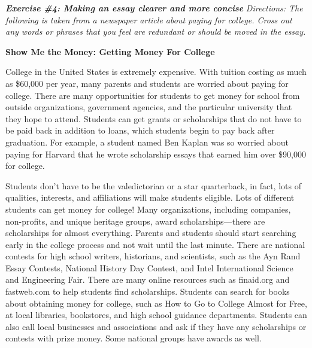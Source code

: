 \documentclass[12pt]{book}
\renewcommand{\indent}{\hspace{1cm}}
\begin{document}
\bigskip
\textbf{\textit{Exercise \#4: Making an essay clearer and more concise}}
\bigskip
\textit{Directions: The following is taken from a newspaper article about paying for college. Cross out any words or phrases that you feel are redundant or should be moved in the essay.}

\begin{spacing}{2}
\begin{center}
\textbf{Show Me the Money: Getting Money For College}
\end{center}

\begin{linenumbers*}
\modulolinenumbers[5]
\indent College in the United States is extremely expensive. With tuition costing as much as \$60,000 per year, many parents and students are worried about paying for college. There are many opportunities for students to get money for school from outside organizations, government agencies, and the particular university that they hope to attend. Students can get grants or scholarships that do not have to be paid back in addition to loans, which students begin to pay back after graduation. For example, a student named Ben Kaplan was so worried about paying for Harvard that he wrote scholarship essays that earned him over \$90,000 for college.

\indent Students don't have to be the valedictorian or a star quarterback, in fact, lots of qualities, interests, and affiliations will make students eligible. Lots of different students can get money for college! Many organizations, including companies, non-profits, and unique heritage groups, award scholarships—there are scholarships for almost everything. Parents and students should start searching early in the college process and not wait until the last minute. There are national contests for high school writers, historians, and scientists, such as the Ayn Rand Essay Contests, National History Day Contest, and Intel International Science and Engineering Fair. There are many online resources such as finaid.org and fastweb.com to help students find scholarships. Students can search for books about obtaining money for college, such as How to Go to College Almost for Free, at local libraries, bookstores, and high school guidance departments.  Students can also call local businesses and associations and ask if they have any scholarships or contests with prize money.  Some national groups have awards as well.


\end{linenumbers*}
\end{spacing}
\end{document}
